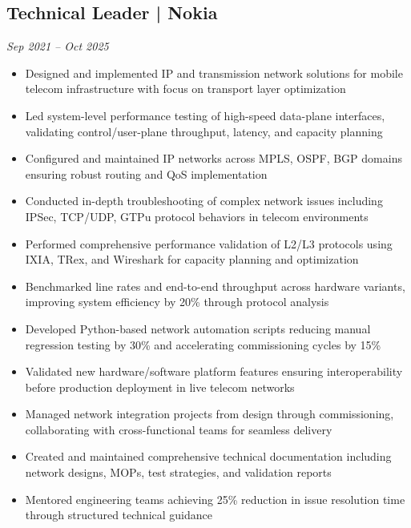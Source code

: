 \documentclass[10pt,a4paper]{article}
\begin{document}
\subsection*{Technical Leader | Nokia}
\hfill \textit{Sep 2021 -- Oct 2025}
\begin{itemize}
    \item Designed and implemented IP and transmission network solutions for mobile telecom infrastructure with focus on transport layer optimization
    \item Led system-level performance testing of high-speed data-plane interfaces, validating control/user-plane throughput, latency, and capacity planning
    \item Configured and maintained IP networks across MPLS, OSPF, BGP domains ensuring robust routing and QoS implementation
    \item Conducted in-depth troubleshooting of complex network issues including IPSec, TCP/UDP, GTPu protocol behaviors in telecom environments
    \item Performed comprehensive performance validation of L2/L3 protocols using IXIA, TRex, and Wireshark for capacity planning and optimization
    \item Benchmarked line rates and end-to-end throughput across hardware variants, improving system efficiency by 20\% through protocol analysis
    \item Developed Python-based network automation scripts reducing manual regression testing by 30\% and accelerating commissioning cycles by 15\%
    \item Validated new hardware/software platform features ensuring interoperability before production deployment in live telecom networks
    \item Managed network integration projects from design through commissioning, collaborating with cross-functional teams for seamless delivery
    \item Created and maintained comprehensive technical documentation including network designs, MOPs, test strategies, and validation reports
    \item Mentored engineering teams achieving 25\% reduction in issue resolution time through structured technical guidance
\vspace{2pt}
\end{itemize}

\vspace{8pt}
\end{document}
